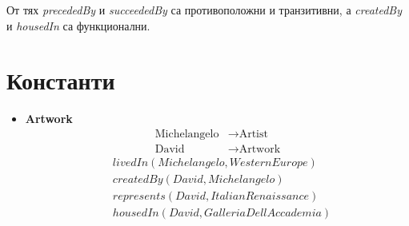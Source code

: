 \documentclass[a4paper, 11pt]{article}
\begin{document}
От тях \emph{precededBy} и \emph{succeededBy} са противоположни и транзитивни, а \emph{createdBy} и \emph{housedIn} са функционални.

\section*{Константи}
\begin{itemize}
  \item \textbf{Artwork}
    \begin{align*}
      \text{Michelangelo} &\to \text{Artist}\\
      \text{David} &\to \text{Artwork}
    \end{align*}
    \begin{align*}
      &livedIn(Michelangelo, WesternEurope)\\
      &createdBy(David, Michelangelo)\\
      &represents(David, ItalianRenaissance)\\
      &housedIn(David, GalleriaDellAccademia)
    \end{align*}


\end{itemize}
\end{document}
